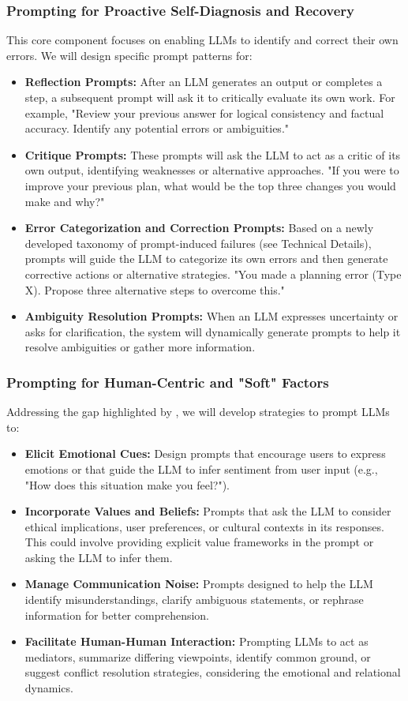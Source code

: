 \documentclass{article}
\begin{document}
\subsubsection{Prompting for Proactive Self-Diagnosis and Recovery}
This core component focuses on enabling LLMs to identify and correct their own errors. We will design specific prompt patterns for:
\begin{itemize}
    \item \textbf{Reflection Prompts:} After an LLM generates an output or completes a step, a subsequent prompt will ask it to critically evaluate its own work. For example, "Review your previous answer for logical consistency and factual accuracy. Identify any potential errors or ambiguities."
    \item \textbf{Critique Prompts:} These prompts will ask the LLM to act as a critic of its own output, identifying weaknesses or alternative approaches. "If you were to improve your previous plan, what would be the top three changes you would make and why?"
    \item \textbf{Error Categorization and Correction Prompts:} Based on a newly developed taxonomy of prompt-induced failures (see Technical Details), prompts will guide the LLM to categorize its own errors and then generate corrective actions or alternative strategies. "You made a planning error (Type X). Propose three alternative steps to overcome this."
    \item \textbf{Ambiguity Resolution Prompts:} When an LLM expresses uncertainty or asks for clarification, the system will dynamically generate prompts to help it resolve ambiguities or gather more information.
\end{itemize}

\subsubsection{Prompting for Human-Centric and "Soft" Factors}
Addressing the gap highlighted by \cite{paper2_requirements}, we will develop strategies to prompt LLMs to:
\begin{itemize}
    \item \textbf{Elicit Emotional Cues:} Design prompts that encourage users to express emotions or that guide the LLM to infer sentiment from user input (e.g., "How does this situation make you feel?").
    \item \textbf{Incorporate Values and Beliefs:} Prompts that ask the LLM to consider ethical implications, user preferences, or cultural contexts in its responses. This could involve providing explicit value frameworks in the prompt or asking the LLM to infer them.
    \item \textbf{Manage Communication Noise:} Prompts designed to help the LLM identify misunderstandings, clarify ambiguous statements, or rephrase information for better comprehension.
    \item \textbf{Facilitate Human-Human Interaction:} Prompting LLMs to act as mediators, summarize differing viewpoints, identify common ground, or suggest conflict resolution strategies, considering the emotional and relational dynamics.
\end{itemize}
\end{document}
